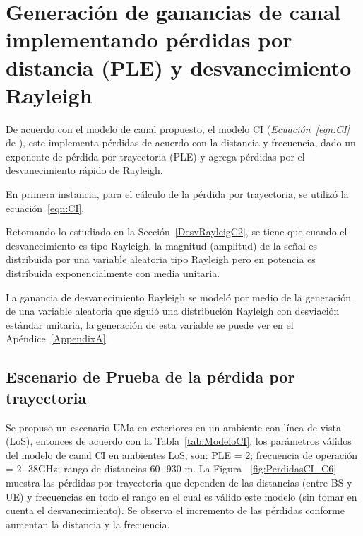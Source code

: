 \break
\section{Generación de ganancias de canal implementando pérdidas por distancia (PLE) y desvanecimiento Rayleigh}

De acuerdo con el modelo de canal propuesto, el modelo CI (\textit{Ecuación~\ref{eqn:CI}} de \parencite{Sun2016}), este implementa pérdidas de acuerdo con la distancia y frecuencia, dado un exponente de pérdida por trayectoria (PLE) y agrega pérdidas por el desvanecimiento rápido de Rayleigh.\newline

En primera instancia, para el cálculo de la pérdida por trayectoria, se utilizó la ecuación~\ref{eqn:CI}.

Retomando lo estudiado en la Sección~\ref{DesvRayleigC2}, se tiene que cuando el desvanecimiento es tipo Rayleigh, la magnitud (amplitud) de la señal es distribuida por una variable aleatoria tipo Rayleigh pero en potencia es distribuida exponencialmente con media unitaria. \newline

La ganancia de desvanecimiento Rayleigh se modeló por medio de la generación de una variable aleatoria que siguió una distribución Rayleigh con desviación estándar unitaria, la generación de esta variable se puede ver en el Apéndice~\ref{AppendixA}.

\subsection{Escenario de Prueba de la pérdida por trayectoria}

Se propuso un escenario UMa en exteriores en un ambiente con línea de vista (LoS), entonces de acuerdo con la Tabla~\ref{tab:ModeloCI}, los parámetros válidos del modelo de canal CI en ambientes LoS, son: PLE = 2; frecuencia de operación = 2- 38GHz; rango de distancias 60- 930 m. La Figura ~\ref{fig:PerdidasCI_C6} muestra las pérdidas por trayectoria que dependen de las distancias (entre BS y UE) y frecuencias en todo el rango en el cual es válido este modelo (sin tomar en cuenta el desvanecimiento). Se observa el incremento de las pérdidas conforme aumentan la distancia y la frecuencia. \newline

